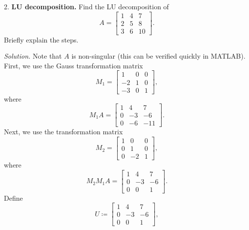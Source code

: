 \documentclass{article}
\begin{document}
\newpage

2. \textbf{LU decomposition.}
Find the LU decomposition of
%
\begin{equation*}
    A =
    \begin{bmatrix}
        1 & 4 & 7 \\
        2 & 5 & 8 \\
        3 & 6 & 10
    \end{bmatrix}
    .
\end{equation*}
%
Briefly explain the steps.

\textit{Solution.}
Note that $A$ is non-singular (this can be verified quickly in MATLAB).
First, we use the Gauss transformation matrix
%
\begin{equation*}
    M_1 =
    \begin{bmatrix}
        1 & 0 & 0 \\
        -2 & 1 & 0 \\
        -3 & 0 & 1
    \end{bmatrix}
    ,
\end{equation*}
%
where
%
\begin{equation*}
    M_1 A =
    \begin{bmatrix}
        1 & 4 & 7 \\
        0 & -3 & -6 \\
        0 & -6 & -11
    \end{bmatrix}
    .
\end{equation*}
%
Next, we use the transformation matrix
%
\begin{equation*}
    M_2 =
    \begin{bmatrix}
        1 & 0 & 0 \\
        0 & 1 & 0 \\
        0 & -2 & 1
    \end{bmatrix}
    ,
\end{equation*}
%
where
%
\begin{equation*}
    M_2 M_1 A =
    \begin{bmatrix}
        1 & 4 & 7 \\
        0 & -3 & -6 \\
        0 & 0 & 1
    \end{bmatrix}
    .
\end{equation*}
%
Define
%
\begin{equation*}
    U \coloneqq
    \begin{bmatrix}
        1 & 4 & 7 \\
        0 & -3 & -6 \\
        0 & 0 & 1
    \end{bmatrix}
    ,
\end{equation*}
\end{document}
